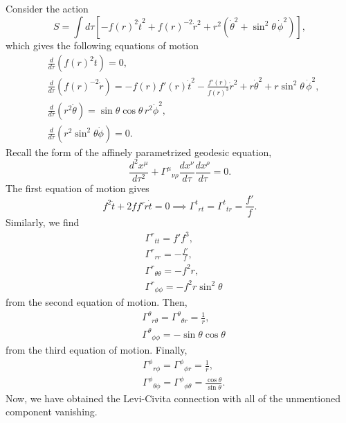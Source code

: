 \begin{solution}
    Consider the action
    \begin{equation}
        S = \int d\tau\left[ -f(r)^2 \dot{t}^2+ f(r)^{-2}\dot{r}^2 + r^2\!\left(\dot{\theta}^2 + \sin^2\theta\,\dot{\phi}^2\right)\right],
    \end{equation}
    which gives the following equations of motion
    \begin{align}
        &\frac{d}{d\tau}\left(f(r)^2\dot{t}\right)=0,\\
        &\frac{d}{d\tau}\left(f(r)^{-2}\dot{r}\right)=-f(r)f'(r)\dot{t}^2 -\frac{f'(r)}{f(r)^3}\dot{r}^2+r\dot{\theta}^2 +r\sin^2\theta\,\dot{\phi}^2,\\
        &\frac{d}{d\tau}(r^2\dot{\theta}) = \sin\theta\cos\theta \,r^2\dot{\phi}^2,\\
        &\frac{d}{d\tau}(r^2\sin^2\theta\dot{\phi}) = 0.
    \end{align}
    Recall the form of the affinely parametrized geodesic equation,
    \begin{equation}
        \frac{d^2x^\mu}{d\tau^2} + \Gamma^\mu{}_{\nu\rho}\frac{d x^\nu}{d\tau}\frac{dx^\rho}{d\tau} = 0.
    \end{equation}
    The first equation of motion gives
    \begin{equation}
        f^2\ddot{t} + 2ff'\dot{r}\dot{t} = 0 \implies \Gamma^{t}{}_{rt} = \Gamma^{t}{}_{tr} = \frac{f'}{f}.
    \end{equation}
    Similarly, we find
    \begin{align}
        &\Gamma^r{}_{tt} = f'f^3,\\
        &\Gamma^{r}{}_{rr} = -\frac{f'}{f},\\
        &\Gamma^{r}{}_{\theta\theta} = -f^2r,\\
        &\Gamma^{r}{}_{\phi\phi} = -f^2r\sin^2\theta
    \end{align}
    from the second equation of motion.
    Then,
    \begin{align}
        &\Gamma^\theta{}_{r\theta} = \Gamma^\theta{}_{\theta r} = \frac{1}{r},\\
        &\Gamma^\theta{}_{\phi\phi} = -\sin\theta \cos\theta
    \end{align}
    from the third equation of motion. Finally,
    \begin{align}
        &\Gamma^\phi{}_{r\phi}  = \Gamma^\phi{}_{\phi r} = \frac{1}{r}, \\
        &\Gamma^{\phi}{}_{\theta\phi} = \Gamma^{\phi}{}_{\phi\theta} = \frac{\cos\theta}{\sin\theta}.
    \end{align}
    Now, we have obtained the Levi-Civita connection with all of the unmentioned component vanishing.


\end{solution}

